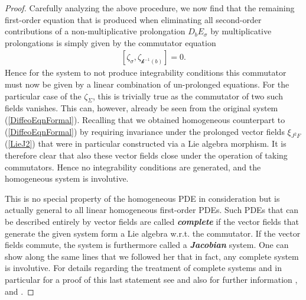 \begin{proof}
Carefully analyzing the above procedure, we now find that the remaining first-order equation that is produced when eliminating all second-order contributions of a non-multiplicative prolongation $D_bE_{\sigma}$ by multiplicative prolongations is simply given by the commutator equation
\begin{align}
    \left [\zeta_{\sigma}, \zeta_{\mathcal{k}^{-1}(b)} \right] = 0.
\end{align}
Hence for the system to not produce integrability conditions this commutator must now be given by a linear combination of un-prolonged equations. For the particular case of the $\zeta_{\Sigma}$, this is trivially true as the commutator of two such fields vanishes. This can, however, already be seen from the original system (\ref{DiffeoEqnFormal}).
Recalling that we obtained homogeneous counterpart to (\ref{DiffeoEqnFormal}) by requiring invariance under the prolonged vector fields $\xi_{J^2F}$ (\ref{LieJ2}) that were in particular constructed via a Lie algebra morphism. It is therefore clear that also these vector fields close under the operation of taking commutators. Hence no integrability conditions are generated, and the homogeneous system is involutive.

This is no special property of the homogeneous PDE in consideration but is actually general to all linear homogeneous first-order PDEs. Such PDEs that can be described entirely by vector fields are called \textit{\textbf{complete}} if the vector fields that generate the given system form a Lie algebra w.r.t. the commutator. If the vector fields commute, the system is furthermore called a \textit{\textbf{Jacobian}} system. One can show along the same lines that we followed her that in fact, any complete system is involutive. For details regarding the treatment of complete systems and in particular for a proof of this last statement see \cite{seiler1994analysis} and also for further information \cite{Clebsch1866}, \cite{caratheodory1956variationsrechnung} and \cite{lie1970theorie}.


\end{proof}
